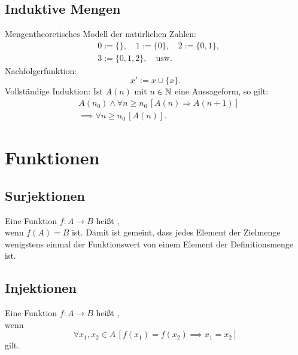 \subsection{Induktive Mengen}
Mengentheoretisches Modell der natürlichen Zahlen:
\begin{equation}
\begin{split}
& 0:=\{\},\quad 1:=\{0\},\quad 2:=\{0,1\},\\
& 3:=\{0,1,2\},\quad \text{usw.}
\end{split}
\end{equation}
Nachfolgerfunktion:
\begin{equation}
x' := x\cup\{x\}.
\end{equation}
Vollständige Induktion: Ist $A(n)$ mit $n\in\mathbb N$
eine Aussageform, so gilt:
\begin{equation}
\begin{split}
& A(n_0)\land \forall n\ge n_0\,[A(n)\Rightarrow A(n+1)]\\
& \implies \forall n\ge n_0\,[A(n)].
\end{split}
\end{equation}

\section{Funktionen}
\subsection{Surjektionen}
\begin{Definition}
Eine Funktion $f\colon A\to B$ heißt ,\\
wenn $f(A)=B$ ist. Damit ist gemeint, dass jedes Element
der Zielmenge wenigstens einmal der Funktionswert von einem
Element der Definitionsmenge ist.
\end{Definition}

\subsection{Injektionen}
\begin{Definition}
Eine Funktion $f\colon A\to B$ heißt ,\\
wenn
\begin{equation}
\forall x_1,x_2\in A\,[f(x_1)=f(x_2)\implies x_1=x_2]
\end{equation}
gilt.
\end{Definition}

